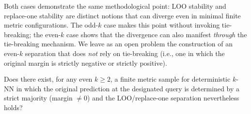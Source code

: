 Both cases demonstrate the same methodological point: LOO stability and
replace-one stability are distinct notions that can diverge even in minimal
finite metric configurations. The odd-$k$ case makes this point without
invoking tie-breaking; the even-$k$ case shows that the divergence can also
manifest {\em through} the tie-breaking mechanism. We leave as an open problem
the construction of an even-$k$ separation that does {\em not} rely on
tie-breaking (i.e., one in which the original margin is strictly negative
or strictly positive).

\begin{openproblem}
Does there exist, for any even $k \ge 2$, a finite metric sample for
deterministic $k$-NN in which the original prediction at the designated query
is determined by a strict majority (margin $\neq 0$) and the
LOO/replace-one separation nevertheless holds?
\end{openproblem}

